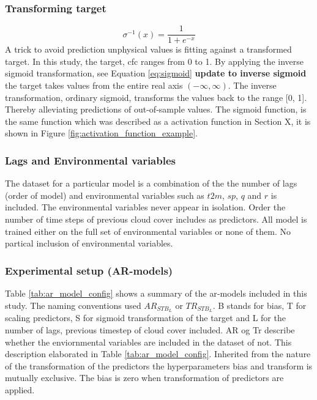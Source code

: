 \subsubsection{Transforming target} \label{sec:transforming_target}
\begin{equation} \label{eq:sigmoid}
   \sigma^{-1} \left( x \right) = \frac{1}{1 + e^{-x}}
\end{equation}
A trick to avoid prediction unphysical values is fitting against a transformed target. In this study, the target, \acrfull{cfc} ranges from 0 to 1. By applying the inverse sigmoid transformation, see Equation \ref{eq:sigmoid} \textbf{update to inverse sigmoid} the target takes values from the entire real axis $(-\infty, \infty)$. 
The inverse transformation, ordinary sigmoid, transforms the values back to the range [0, 1]. Thereby alleviating predictions of out-of-sample values. The sigmoid function, is the same function which was described as a activation function in Section X, it is shown in Figure \ref{fig:activation_function_example}. 

\subsubsection{Lags and Environmental variables}
The dataset for a particular model is a combination of the the number of lags (order of model) and environmental variables such as $t2m$, $sp$, $q$ and $r$ is included. The environmental variables never appear in isolation.
Order the number of time steps of previous cloud cover includes as predictors. All model is trained either on the full set of environmental variables or none of them. No partical inclusion of environmental variables. 

\subsubsection{Experimental setup (AR-models)}
Table \ref{tab:ar_model_config} shows a summary of the \acrshort{ar}-models included in this study. The naming conventions used $AR_{STB_L}$ or $TR_{STB_L}$. B stands for bias, T for scaling predictors, S for sigmoid transformation of the target and L for the number of lags, previous timestep of cloud cover included. AR og Tr describe whether the enviornmental variables are included in the dataset of not. This description elaborated in Table \ref{tab:ar_model_config}. Inherited from the nature of the transformation of the predictors the hyperparameters bias and transform is mutually exclusive. The bias is zero when transformation of predictors are applied. 

